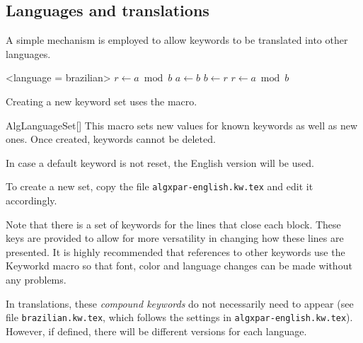 \documentclass[a4paper, 11pt]{article}
\begin{document}
\begin{comment}
    parameter indent = 0pt,
\end{comment}

\subsection{Languages and translations}\label{sec:languages-and-translations}
A simple mechanism is employed to allow keywords to be translated into other languages.

\begingroup
\begin{tcblisting}{}
    \begin{algorithmic}<language = brazilian>
            \State $r\gets a\bmod b$
                \State $a\gets b$
                \State $b\gets r$
                \State $r\gets a\bmod b$
            \EndWhile
        \EndProcedure
    \end{algorithmic}
\end{tcblisting}
\endgroup


Creating a new keyword set uses the  macro.

\begin{macro}{AlgLanguageSet}[]
    This macro sets new values for known keywords as well as new ones. Once created, keywords cannot be deleted.

    In case a default keyword is not reset, the English version will be used.

    To create a new set, copy the file \texttt{algxpar-english.kw.tex} and edit it accordingly.

    Note that there is a set of keywords for the lines that close each block. These keys are provided to allow for more versatility in changing how these lines are presented. It is highly recommended that references to other keywords use the {Keyworkd} macro so that font, color and language changes can be made without any problems.

    In translations, these \textit{compound keywords} do not necessarily need to appear (see file \texttt{brazilian.kw.tex}, which follows the settings in \texttt{algxpar-english.kw.tex}). However, if defined, there will be different versions for each language.
\end{macro}
\end{document}
